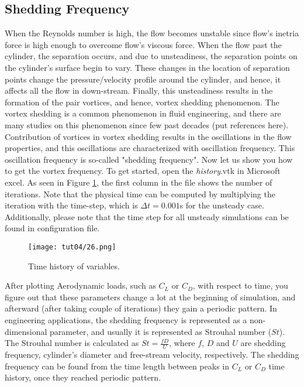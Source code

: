 \subsection{Shedding Frequency}
When the Reynolds number is high, the flow becomes unstable since flow's inetria force is high enough to overcome flow's viscous force. When the flow past the cylinder, the separation occurs, and due to unsteadiness, the separation points on the cylinder's surface begin to vary. These changes in the location of separation points change the pressure/velocity profile around the cylinder, and hence, it affects all the flow in down-stream. Finally, this unsteadiness results in the formation of the pair vortices, and hence, vortex shedding phenomenon. The vortex shedding is a common phenomenon in fluid engineering, and there are many studies on this phenomenon since few past decades (put references here). Contribution of vortices in vortex shedding results in the oscillations in the flow properties, and this oscillations are characterized with oscillation frequency. This oscillation frequency is so-called "shedding frequency". Now let us show you how to get the vortex frequency. To get started, open the \textit{history}.vtk in Microsoft excel. As seen in Figure \ref{fig4:time_history}, the first column in the file shows the number of iterations. Note that the physical time can be computed by multiplying the iteration with the time-step, which is $\Delta t = 0.001$s for the unsteady case. Additionally, please note that the time step for all unsteady simulations can be found in configuration file.
\begin{figure}[htbp]
    \centering
    \texttt{[image: tut04/26.png]}
    \caption{Time history of variables.}
    \label{fig4:time_history}
\end{figure}
After plotting Aerodynamic loads, such as $C_L$ or $C_D$, with respect to time, you figure out that these parameters change a lot at the beginning of simulation, and afterward (after taking couple of iterations) they gain a periodic pattern. In engineering applications, the shedding frequency is represented as a non-dimensional parameter, and usually it is represented as Strouhal number ($St$). The Strouhal number is calculated as $St=\frac{f D}{U}$, where $f$, $D$ and $U$ are shedding frequency, cylinder's diameter and free-stream velocity, respectively. The shedding frequency can be found from the time length between peaks in $C_L$ or $C_D$ time history, once they reached periodic pattern.
